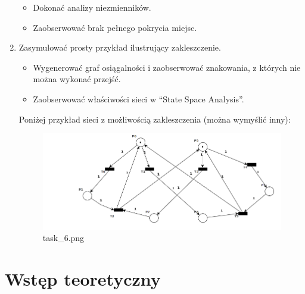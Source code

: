 \documentclass[11pt]{article}
\providecommand{\tightlist}{%
      \setlength{\itemsep}{0pt}\setlength{\parskip}{0pt}}
\begin{document}
\begin{enumerate}
  \begin{itemize}
  \tightlist
  \item
    Dokonać analizy niezmienników.
  \item
    Zaobserwować brak pełnego pokrycia miejsc.
  \end{itemize}
\item
  Zasymulować prosty przykład ilustrujący zakleszczenie.

  \begin{itemize}
  \tightlist
  \item
    Wygenerować graf osiągalności i zaobserwować znakowania, z których
    nie można wykonać przejść.
  \item
    Zaobserwować właściwości sieci w ``State Space Analysis''.
  \end{itemize}

  Poniżej przykład sieci z możliwością zakleszczenia (można wymyślić
  inny):

  \begin{figure}
  \centering
  \includegraphics{task_6.png}
  \caption{task\_6.png}
  \end{figure}
\end{enumerate}

    \hypertarget{wstux119p-teoretyczny}{%
\section{Wstęp teoretyczny}\label{wstux119p-teoretyczny}}
\end{document}
